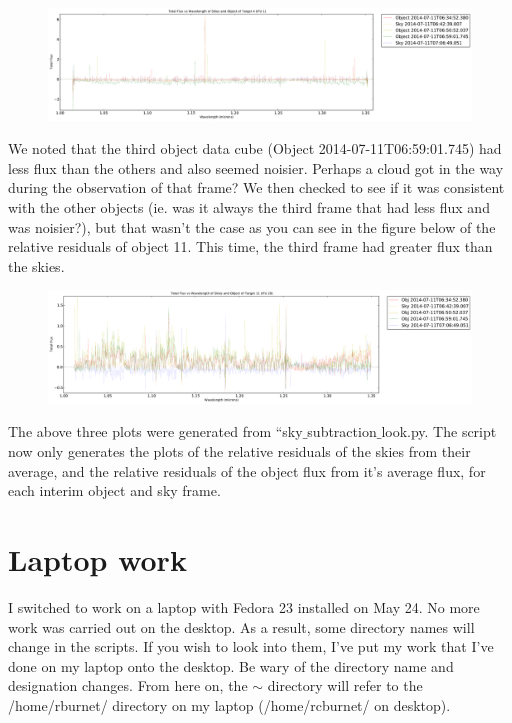 \documentclass[10pt,letterpaper]{article}
\begin{document}
\begin{figure}[h!]
\includegraphics[scale=0.4]{figures/sky_flux_raw.pdf}
\end{figure}

We noted that the third object data cube (Object 2014-07-11T06:59:01.745) had less flux than the others and also seemed noisier. Perhaps a cloud got in the way during the observation of that frame? We then checked to see if it was consistent with the other objects (ie. was it always the third frame that had less flux and was noisier?), but that wasn't the case as you can see in the figure below of the relative residuals of object 11. This time, the third frame had greater flux than the skies.\\

\begin{figure}[h!]
\includegraphics[scale=0.4]{figures/sky_flux.pdf}
\end{figure}

The above three plots were generated from ``sky$\_$subtraction$\_$look.py. The script now only generates the plots of the relative residuals of the skies from their average, and the relative residuals of the object flux from it's average flux, for each interim object and sky frame.\\

\section{Laptop work}
I switched to work on a laptop with Fedora 23 installed on May 24. No more work was carried out on the desktop. As a result, some directory names will change in the scripts. If you wish to look into them, I've put my work that I've done on my laptop onto the desktop. Be wary of the directory name and designation changes. From here on, the $\sim$ directory will refer to the /home/rburnet/ directory on my laptop (/home/rcburnet/ on desktop).
\end{document}
